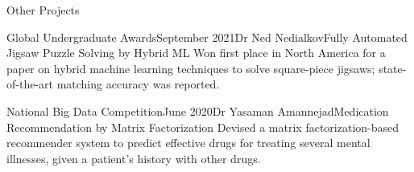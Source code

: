 \begin{rSection}{Other Projects}

\begin{rSubsection}{Global Undergraduate Awards}{September 2021}{Dr Ned Nedialkov}{Fully Automated Jigsaw Puzzle Solving by Hybrid ML}
	Won first place in North America for a paper on hybrid machine learning techniques to solve square-piece jigsaws; state-of-the-art matching accuracy was reported.
\end{rSubsection}

\begin{rSubsection}{National Big Data Competition}{June 2020}{Dr Yasaman Amannejad}{Medication Recommendation by Matrix Factorization}
	Devised a matrix factorization-based recommender system to predict effective drugs for treating several mental illnesses, given a patient's history with other drugs.
\end{rSubsection}






\end{rSection}
